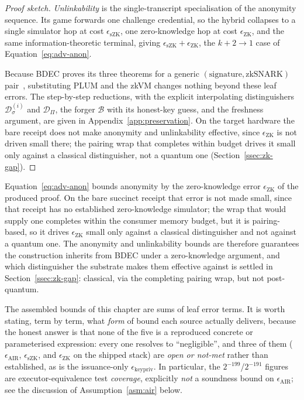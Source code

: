 \begin{proof}[Proof sketch]
    \emph{Unlinkability} is the single-transcript specialisation of the anonymity sequence. Its game forwards one challenge credential, so the hybrid collapses to a single simulator hop at cost $\epsilon_{\mathrm{sZK}}$, one zero-knowledge hop at cost $\epsilon_{\mathrm{ZK}}$, and the same information-theoretic terminal, giving $\epsilon_{\mathrm{sZK}} +\epsilon_{\mathrm{ZK}}$, the $k+2\to1$ case of Equation~\eqref{eq:adv-anon}.
    
    Because BDEC proves its three theorems for a generic $(\text{signature},\text{zkSNARK})$ pair~\cite{10.1007/978-981-96-0957-4_3}, substituting PLUM and the zkVM changes nothing beyond these leaf errors. The step-by-step reductions, with the explicit interpolating distinguishers $\mathcal D_\sigma^{(i)}$ and $\mathcal D_\Pi$, the forger $\mathcal B$ with its honest-key guess, and the freshness argument, are given in Appendix~\ref{app:preservation}. On the target hardware the bare receipt does not make anonymity and unlinkability effective, since $\epsilon_{\mathrm{ZK}}$ is not driven small there; the pairing wrap that completes within budget drives it small only against a classical distinguisher, not a quantum one (Section~\ref{ssec:zk-gap}).
\end{proof}

\begin{remark}
    Equation~\eqref{eq:adv-anon} bounds anonymity by the zero-knowledge error $\epsilon_{\mathrm{ZK}}$ of the produced proof. On the bare succinct receipt that error is not made small, since that receipt has no established zero-knowledge simulator; the wrap that would supply one completes within the consumer memory budget, but it is pairing-based, so it drives $\epsilon_{\mathrm{ZK}}$ small only against a classical distinguisher and not against a quantum one. The anonymity and unlinkability bounds are therefore guarantees the construction inherits from BDEC under a zero-knowledge argument, and which distinguisher the substrate makes them effective against is settled in Section~\ref{ssec:zk-gap}: classical, via the completing pairing wrap, but not post-quantum.
\end{remark}

The assembled bounds of this chapter are sums of leaf error terms. It is worth stating, term by term, what \emph{form} of bound each source actually delivers, because the honest answer is that none of the five is a reproduced concrete or parameterised expression: every one resolves to ``negligible'', and three of them (\(\epsilon_{\mathrm{AIR}}\), \(\epsilon_{\mathrm{sZK}}\), and \(\epsilon_{\mathrm{ZK}}\) on the shipped stack) are \emph{open or not-met} rather than established, as is the issuance-only \(\epsilon_{\mathrm{keypriv}}\). In particular, the $2^{-199}$/$2^{-191}$ figures are executor-equivalence test \emph{coverage}, explicitly \emph{not} a soundness bound on \(\epsilon_{\mathrm{AIR}}\); see the discussion of Assumption~\ref{asm:air} below.

